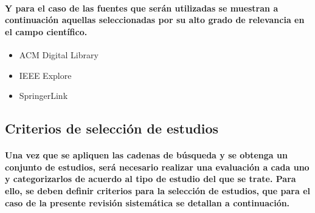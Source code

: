 \documentclass[10pt, twocolumn]{article}
\begin{document}
\paragraph{Y para el caso de las fuentes que serán utilizadas se muestran a continuación aquellas seleccionadas por su alto grado de relevancia en el campo científico.}
\begin{itemize}
	\item{ACM Digital Library}
	\item{IEEE Explore}
	\item{SpringerLink}
\end{itemize}

\subsection{Criterios de selección de estudios}
\paragraph{Una vez que se apliquen las cadenas de búsqueda y se obtenga un conjunto de estudios, será necesario realizar una evaluación a cada uno y categorizarlos de acuerdo al tipo de estudio del que se trate. Para ello, se deben definir criterios para la selección de estudios, que para el caso de la presente revisión sistemática se detallan a continuación.}
\end{document}
